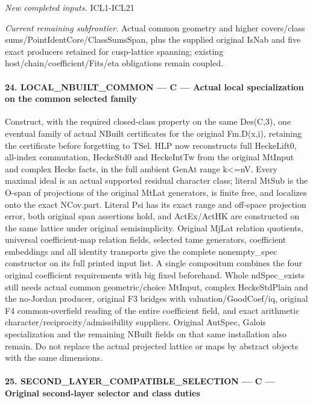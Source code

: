 \emph{New completed inputs.} ICL1-ICL21

\emph{Current remaining subfrontier.} Actual common geometry and higher covers/class sums/PointIdentCore/ClassSumsSpan, plus the supplied original IsNab and five exact producers retained for cusp-lattice spanning; existing host/chain/coefficient/Fits/eta obligations remain coupled.



\paragraph{24. LOCAL\_\allowbreak NBUILT\_\allowbreak COMMON — C — Actual local specialization on the common selected family}

Construct, with the required closed-class property on the same Des(C,3), one eventual family of actual NBuilt certificates for the original Fm.D(x,i), retaining the certificate before forgetting to TSel. HLP now reconstructs full HeckeLift0, all-index commutation, HeckeStd0 and HeckeIntTw from the original MtInput and complex Hecke facts, in the full ambient GenAt range k<=nV. Every maximal ideal is an actual supported residual character class; literal MtSub is the O-span of projections of the original MtLat generators, is finite free, and localizes onto the exact NCov.part. Literal Psi has its exact range and off-space projection error, both original span assertions hold, and ActEx/ActHK are constructed on the same lattice under original semisimplicity. Original MjLat relation quotients, universal coefficient-map relation fields, selected tame generators, coefficient embeddings and all identity transports give the complete nonempty\_\allowbreak spec constructor on its full printed input list. A single compositum combines the four original coefficient requirements with big fixed beforehand. Whole ndSpec\_\allowbreak exists still needs actual common geometric/choice MtInput, complex HeckeStdPlain and the no-Jordan producer, original F3 bridges with valuation/GoodCoef/iq, original F4 common-overfield reading of the entire coefficient field, and exact arithmetic character/reciprocity/admissibility suppliers. Original AutSpec, Galois specialization and the remaining NBuilt fields on that same installation also remain. Do not replace the actual projected lattice or maps by abstract objects with the same dimensions.



\paragraph{25. SECOND\_\allowbreak LAYER\_\allowbreak COMPATIBLE\_\allowbreak SELECTION — C — Original second-layer selector and class duties}

